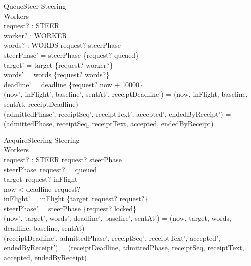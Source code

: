 \documentclass[a4paper,10pt,fleqn]{article}
\begin{document}
\begin{schema}{QueueSteer}
  \Delta Steering \\
  \Xi Workers \\
  request? : STEER \\
  worker? : WORKER \\
  words? : WORDS
\where
  request? \notin \dom steerPhase \\
  steerPhase' = steerPhase \cup \{request? \mapsto queued\} \\
  target' = target \cup \{request? \mapsto worker?\} \\
  words' = words \cup \{request? \mapsto words?\} \\
  deadline' = deadline \cup \{request? \mapsto now + 10000\} \\
  (now', inFlight', baseline', sentAt', receiptDeadline') =
    (now, inFlight, baseline, sentAt, receiptDeadline) \\
  (admittedPhase', receiptSeq', receiptText', accepted', endedByReceipt') =
    (admittedPhase, receiptSeq, receiptText, accepted, endedByReceipt)
\end{schema}

\begin{schema}{AcquireSteering}
  \Delta Steering \\
  \Xi Workers \\
  request? : STEER
\where
  request? \in \dom steerPhase \\
  steerPhase~request? = queued \\
  target~request? \notin \dom inFlight \\
  now < deadline~request? \\
  inFlight' = inFlight \cup \{target~request? \mapsto request?\} \\
  steerPhase' = steerPhase \oplus \{request? \mapsto locked\} \\
  (now', target', words', deadline', baseline', sentAt') =
    (now, target, words, deadline, baseline, sentAt) \\
  (receiptDeadline', admittedPhase', receiptSeq', receiptText', accepted', endedByReceipt') =
    (receiptDeadline, admittedPhase, receiptSeq, receiptText, accepted, endedByReceipt)
\end{schema}
\end{document}

